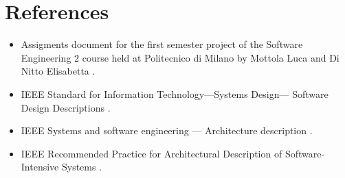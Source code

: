 \section{References}

\begin{itemize}
	\item Assigments document for the first semester project of the Software Engineering 2 course held at Politecnico di Milano by Mottola Luca and Di Nitto Elisabetta \cite{assignments}.
	\item IEEE Standard for Information Technology—Systems Design— Software Design Descriptions \cite{ieee_sdd}.
	\item IEEE Systems and software engineering — Architecture description \cite{ieee_arch}.
	\item IEEE Recommended Practice for Architectural Description of Software-Intensive Systems \cite{ieee1471}.
\end{itemize}
